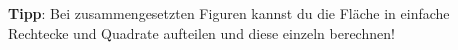         


\vspace{1em}

\textbf{Tipp}: Bei zusammengesetzten Figuren kannst du die Fläche in einfache Rechtecke und Quadrate aufteilen und diese einzeln berechnen!